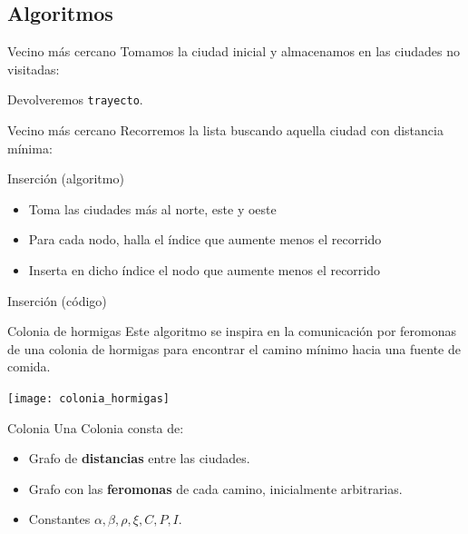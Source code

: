 \subsection{Algoritmos}

\begin{frame}[fragile]{Vecino más cercano}
Tomamos la ciudad inicial y almacenamos en las ciudades no visitadas:

Devolveremos \texttt{trayecto}.
\end{frame}

\begin{frame}[fragile]{Vecino más cercano}
\vspace*{-.5cm}
Recorremos la lista buscando aquella ciudad con distancia mínima:

\end{frame}

\begin{frame}{Inserción (algoritmo)}
  \begin{itemize}
    \item Toma las ciudades más al norte, este y oeste
    \item Para cada nodo, halla el índice que aumente menos el recorrido
    \item Inserta en dicho índice el nodo que aumente menos el recorrido
  \end{itemize}
\end{frame}

\begin{frame}[fragile]{Inserción (código)}
\vspace*{-.5cm}

\end{frame}

\begin{frame}{Colonia de hormigas}
Este algoritmo se inspira en la comunicación por feromonas
de una colonia de hormigas para encontrar el camino mínimo hacia una fuente de comida.

\begin{center}
\texttt{[image: colonia\_hormigas]}
\end{center}

\end{frame}

\begin{frame}{Colonia}
Una Colonia consta de:
\begin{itemize}
  \item Grafo de \textbf{distancias} entre las ciudades.
  \item Grafo con las \textbf{feromonas} de cada camino, inicialmente arbitrarias.
  \item Constantes $\alpha, \beta, \rho, \xi, C, P, I$.
\end{itemize}
\end{frame}


